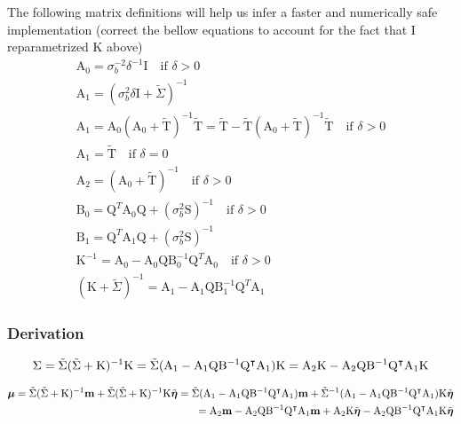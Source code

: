 The following matrix definitions will help us infer a faster and numerically
safe implementation (correct the bellow equations to account for the fact that I
reparametrized K above)
\begin{align*}
\mathrm A_0 = \sigma_b^{-2} \delta^{-1} \mathrm I \quad \text{if }\delta > 0\\
\mathrm A_1 = (\sigma_b^2 \delta \mathrm I + \tilde\Sigma)^{-1}\\
\mathrm A_1 = \mathrm A_0 (\mathrm A_0 + \tilde{\mathrm T})^{-1} \tilde{\mathrm T} = \tilde{\mathrm T} - \tilde{\mathrm T} (\mathrm A_0 + \tilde{\mathrm T})^{-1} \tilde{\mathrm T} \quad \text{if }\delta > 0\\
\mathrm A_1 = \tilde{\mathrm T} \quad \text{if } \delta = 0\\
\mathrm A_2 = (\mathrm A_0 + \tilde{\mathrm T})^{-1} \quad \text{if } \delta > 0\\
\mathrm B_0 = \mathrm Q^T \mathrm A_0 \mathrm Q + (\sigma_b^2 \mathrm S)^{-1} \quad \text{if } \delta > 0\\
\mathrm B_1 = \mathrm Q^T \mathrm A_1 \mathrm Q + (\sigma_b^2 \mathrm S)^{-1}\\
\mathrm K^{-1} = \mathrm A_0 - \mathrm A_0 \mathrm Q \mathrm B_0^{-1} \mathrm Q^T \mathrm A_0 \quad \text{if } \delta > 0\\
(\mathrm K + \tilde{\Sigma})^{-1} = \mathrm A_1 - \mathrm A_1 \mathrm Q\mathrm B_1^{-1} \mathrm Q^T \mathrm A_1
\end{align*}

\subsubsection{Derivation}

\begin{align*}
\Sigma = \tilde{\Sigma} (\tilde{\Sigma} + \mathrm K)^{-1} \mathrm K = \tilde{\Sigma} (\mathrm A_1 - \mathrm A_1 \mathrm Q \mathrm B^{-1}\mathrm Q^\intercal \mathrm A_1) \mathrm K
= \mathrm A_2 \mathrm K - \mathrm A_2 \mathrm Q
          \mathrm B^{-1}\mathrm Q^\intercal \mathrm A_1 \mathrm K
\end{align*}

\begin{align*}
\boldsymbol\mu = \tilde{\Sigma} (\tilde{\Sigma} + \mathrm K)^{-1} \mathbf m + \tilde{\Sigma} (\tilde{\Sigma} +
\mathrm K)^{-1} \mathrm K \tilde{\boldsymbol\eta}
= \tilde{\Sigma} (\mathrm A_1 - \mathrm A_1 \mathrm Q \mathrm B^{-1}\mathrm Q^\intercal \mathrm A_1) \mathbf m +
\tilde{\Sigma}^{-1} (\mathrm A_1 - \mathrm A_1 \mathrm Q \mathrm B^{-1}\mathrm Q^\intercal \mathrm A_1)
          \mathrm K \tilde{\boldsymbol \eta}\\
= \mathrm A_2 \mathbf m - \mathrm A_2 \mathrm Q \mathrm B^{-1}\mathrm Q^\intercal \mathrm A_1 \mathbf m
         + \mathrm A_2 \mathrm K \tilde{\boldsymbol \eta} - \mathrm A_2 \mathrm Q \mathrm B^{-1}\mathrm Q^\intercal
           \mathrm A_1 \mathrm K \tilde{\boldsymbol \eta}
\end{align*}


